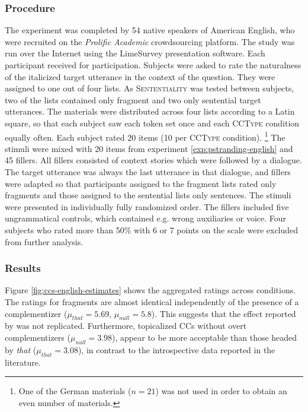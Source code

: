 \subsubsection{Procedure}\label{sec:ccs-english-method}
The experiment was completed by 54 native speakers of American English, who were recruited on the \textit{Prolific Academic} crowdsourcing platform. The study was run over the Internet using the LimeSurvey presentation software. Each participant received  for participation. Subjects were asked to rate the naturalness of the italicized target utterance in the context of the question. They were assigned to one out of four lists. As \textsc{Sententiality} was tested between subjects, two of the lists contained only fragment and two only sentential target utterances. The materials were distributed across four lists according to a Latin square, so that each subject saw each token set once and each \textsc{CCType} condition equally often. 
Each subject rated 20 items (10 per \textsc{CCType} condition).%
%
\footnote{One of the German materials ($n=21$) was not used in order to obtain an even number of materials.}\afterfn%
%
The stimuli were mixed with 20 items from experiment \ref{exp:pstranding-english} and 45 fillers. All fillers consisted of context stories which were followed by a dialogue. The target utterance was always the last utterance in that dialogue, and fillers were adapted so that participants assigned to the fragment lists rated only fragments and those assigned to the sentential lists only sentences. The stimuli were presented in individually fully randomized order. The fillers included five ungrammatical controls, which contained e.g. wrong auxiliaries or voice. Four subjects who rated more than 50\% with 6 or 7 points on the scale were excluded from further analysis.

\subsubsection{Results}\label{sec:ccs-english-results}

Figure \ref{fig:ccs-english-estimates} shows the aggregated ratings across conditions. The ratings for fragments are almost identical independently of the presence of a complementizer ($\mu_{that} = 5.69$, $\mu_{null} = 5.8$). This suggests that the effect reported by \citet{merchant.etal2013} was not replicated. Furthermore, topicalized CCs without overt complementizers ($\mu_{null} = 3.98$), appear to be more acceptable than those headed by \textit{that} ($\mu_{that} = 3.08$), in contrast to the introspective data reported in the literature.

